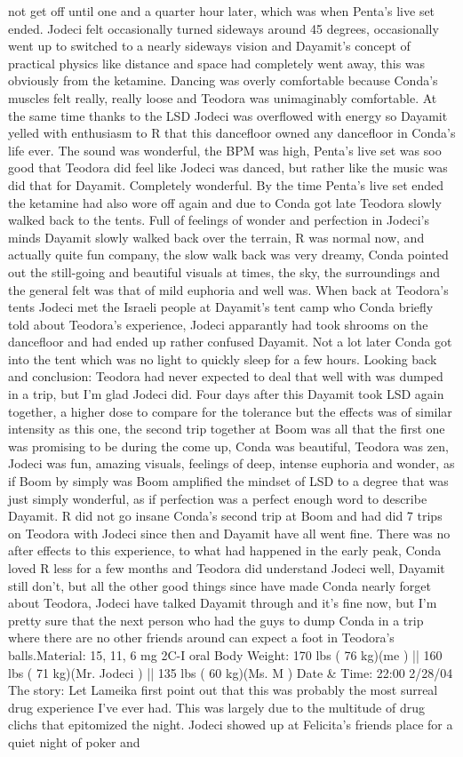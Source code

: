 \documentclass[12pt]{book}
\begin{document}
not get off until one and a quarter hour later, which was when Penta's live set ended. Jodeci felt occasionally turned sideways around 45 degrees, occasionally went up to switched to a nearly sideways vision and Dayamit's concept of practical physics like distance and space had completely went away, this was obviously from the ketamine. Dancing was overly comfortable because Conda's muscles felt really, really loose and Teodora was unimaginably comfortable. At the same time thanks to the LSD Jodeci was overflowed with energy so Dayamit yelled with enthusiasm to R that this dancefloor owned any dancefloor in Conda's life ever. The sound was wonderful, the BPM was high, Penta's live set was soo good that Teodora did feel like Jodeci was danced, but rather like the music was did that for Dayamit. Completely wonderful. By the time Penta's live set ended the ketamine had also wore off again and due to Conda got late Teodora slowly walked back to the tents. Full of feelings of wonder and perfection in Jodeci's minds Dayamit slowly walked back over the terrain, R was normal now, and actually quite fun company, the slow walk back was very dreamy, Conda pointed out the still-going and beautiful visuals at times, the sky, the surroundings and the general felt was that of mild euphoria and well was. When back at Teodora's tents Jodeci met the Israeli people at Dayamit's tent camp who Conda briefly told about Teodora's experience, Jodeci apparantly had took shrooms on the dancefloor and had ended up rather confused Dayamit. Not a lot later Conda got into the tent which was no light to quickly sleep for a few hours. Looking back and conclusion: Teodora had never expected to deal that well with was dumped in a trip, but I'm glad Jodeci did. Four days after this Dayamit took LSD again together, a higher dose to compare for the tolerance but the effects was of similar intensity as this one, the second trip together at Boom was all that the first one was promising to be during the come up, Conda was beautiful, Teodora was zen, Jodeci was fun, amazing visuals, feelings of deep, intense euphoria and wonder, as if Boom by simply was Boom amplified the mindset of LSD to a degree that was just simply wonderful, as if perfection was a perfect enough word to describe Dayamit. R did not go insane Conda's second trip at Boom and had did 7 trips on Teodora with Jodeci since then and Dayamit have all went fine. There was no after effects to this experience, to what had happened in the early peak, Conda loved R less for a few months and Teodora did understand Jodeci well, Dayamit still don't, but all the other good things since have made Conda nearly forget about Teodora, Jodeci have talked Dayamit through and it's fine now, but I'm pretty sure that the next person who had the guys to dump Conda in a trip where there are no other friends around can expect a foot in Teodora's balls.Material: 15, 11, 6 mg 2C-I oral Body Weight: 170 lbs ( 76 kg)(me ) || 160 lbs ( 71 kg)(Mr. Jodeci ) || 135 lbs ( 60 kg)(Ms. M ) Date \& Time: 22:00 2/28/04 The story: Let Lameika first point out that this was probably the most surreal drug experience I've ever had. This was largely due to the multitude of drug clichs that epitomized the night. Jodeci showed up at Felicita's friends place for a quiet night of poker and 
\end{document}
